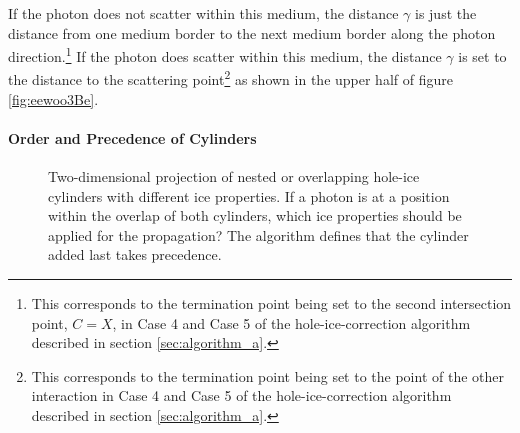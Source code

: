 If the photon does not scatter within this medium, the distance $\gamma$ is just the distance from one medium border to the next medium border along the photon direction.\footnote{This corresponds to the termination point being set to the second intersection point, $C = X$, in Case 4 and Case 5 of the hole-ice-correction algorithm described in section \ref{sec:algorithm_a}.}
If the photon does scatter within this medium, the distance $\gamma$ is set to the distance to the scattering point\footnote{This corresponds to the termination point being set to the point of the other interaction in Case 4 and Case 5 of the hole-ice-correction algorithm described in section \ref{sec:algorithm_a}.} as shown in the upper half of figure \ref{fig:eewoo3Be}.

\paragraph{Order and Precedence of Cylinders}

\begin{figure}[htbp]
  \caption{Two-dimensional projection of nested or overlapping hole-ice cylinders with different ice properties. If a photon is at a position within the overlap of both cylinders, which ice properties should be applied for the propagation? The algorithm defines that the cylinder added last takes precedence.}
  \label{fig:kuZ8deek}
\end{figure}

